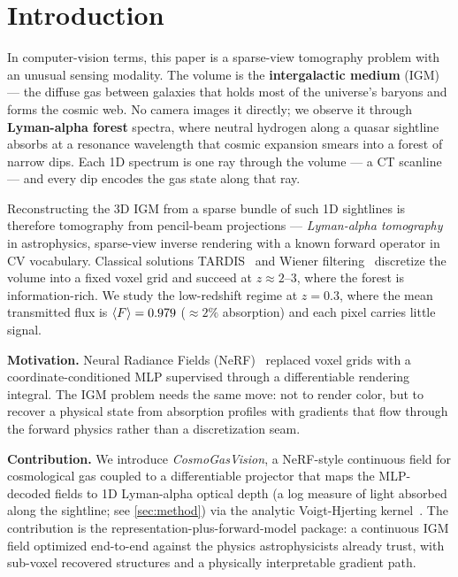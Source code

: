 \section{Introduction}
\label{sec:intro}

In computer-vision terms, this paper is a sparse-view tomography problem with an unusual sensing modality. The volume is the \textbf{intergalactic medium} (IGM) --- the diffuse gas between galaxies that holds most of the universe's baryons and forms the cosmic web. No camera images it directly; we observe it through \textbf{Lyman-alpha forest} spectra, where neutral hydrogen along a quasar sightline absorbs at a resonance wavelength that cosmic expansion smears into a forest of narrow dips. Each 1D spectrum is one ray through the volume --- a CT scanline --- and every dip encodes the gas state along that ray.

Reconstructing the 3D IGM from a sparse bundle of such 1D sightlines is therefore tomography from pencil-beam projections --- \emph{Lyman-alpha tomography}~\cite{stark2015tomography} in astrophysics, sparse-view inverse rendering with a known forward operator in CV vocabulary. Classical solutions TARDIS~\cite{horowitz2019tardis} and Wiener filtering~\cite{stark2015tomography} discretize the volume into a fixed voxel grid and succeed at $z \approx 2$--$3$, where the forest is information-rich. We study the low-redshift regime at $z = 0.3$, where the mean transmitted flux is $\langle F\rangle = 0.979$ ($\approx 2\%$ absorption) and each pixel carries little signal.

\textbf{Motivation.} Neural Radiance Fields (NeRF)~\cite{mildenhall2020nerf} replaced voxel grids with a coordinate-conditioned MLP supervised through a differentiable rendering integral. The IGM problem needs the same move: not to render color, but to recover a physical state from absorption profiles with gradients that flow through the forward physics rather than a discretization seam.

\textbf{Contribution.} We introduce \emph{CosmoGasVision}, a NeRF-style continuous field for cosmological gas coupled to a differentiable projector that maps the MLP-decoded fields to 1D Lyman-alpha optical depth (a log measure of light absorbed along the sightline; see \cref{sec:method}) via the analytic Voigt-Hjerting kernel~\cite{tepper2006voigt}. The contribution is the representation-plus-forward-model package: a continuous IGM field optimized end-to-end against the physics astrophysicists already trust, with sub-voxel recovered structures and a physically interpretable gradient path.

